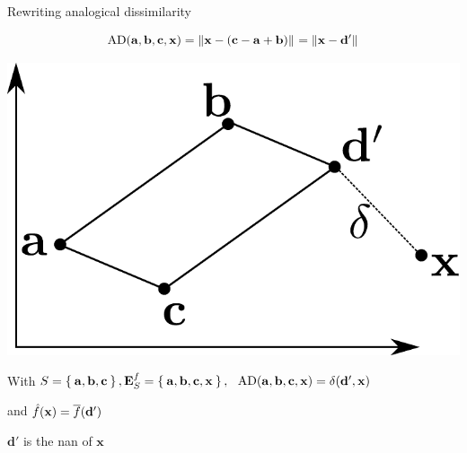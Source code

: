 \documentclass{beamer}
\begin{document}
\begin{frame}{Rewriting analogical dissimilarity}

$$\text{AD}(\mathbf{a},\mathbf{b},\mathbf{c},\mathbf{x})={\left\lVert\mathbf{x} -
(\mathbf{c}-\mathbf{a}+\mathbf{b})\right\rVert}_{}={\left\lVert\mathbf{x} - \mathbf{d}'\right\rVert}_{}$$
\begin{center}
  \includegraphics[width=.3\textwidth]{figures/analogical_dissimilarity_pres.pdf}
\end{center}

  With $S = \Set{\mathbf{a}, \mathbf{b}, \mathbf{c}}, \mathbf{E}_{S}^{f} = \Set{\mathbf{a},
  \mathbf{b}, \mathbf{c}, \mathbf{x}}, ~~ \text{AD}(\mathbf{a}, \mathbf{b},
  \mathbf{c}, \mathbf{x}) = \delta(\mathbf{d}', \mathbf{x})$

  and $\hat{f}(\mathbf{x}) = \overline{f}(\mathbf{d}')$

  $\mathbf{d}'$ is the \alert{nan} of $\mathbf{x}$
\end{frame}
\end{document}
